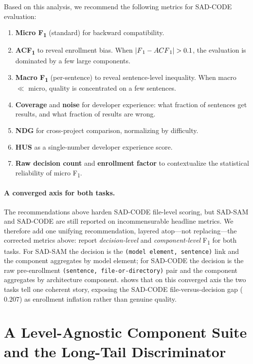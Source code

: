 \documentclass[11pt,a4paper]{report}
\newcommand{\sadcode}{SAD-CODE\xspace}
\newcommand{\sadsam}{SAD-SAM\xspace}
\newcommand{\fone}{F\textsubscript{1}\xspace}
\newcommand{\acfone}{ACF\textsubscript{1}\xspace}
\begin{document}
Based on this analysis, we recommend the following metrics for \sadcode
evaluation:

\begin{enumerate}
\item \textbf{Micro \fone} (standard) for backward compatibility.
\item \textbf{\acfone} to reveal enrollment bias. When $|\fone - \acfone| >
  0.1$, the evaluation is dominated by a few large components.
\item \textbf{Macro \fone} (per-sentence) to reveal sentence-level inequality.
  When macro $\ll$ micro, quality is concentrated on a few sentences.
\item \textbf{Coverage} and \textbf{noise} for developer experience:
  what fraction of sentences get results, and what fraction of results are wrong.
\item \textbf{NDG} for cross-project comparison, normalizing by difficulty.
\item \textbf{HUS} as a single-number developer experience score.
\item \textbf{Raw decision count} and \textbf{enrollment factor} to
  contextualize the statistical reliability of micro \fone.
\end{enumerate}

\paragraph{A converged axis for both tasks.}
The recommendations above harden \sadcode file-level scoring, but \sadsam
and \sadcode are still reported on incommensurable headline metrics. We
therefore add one unifying recommendation, layered atop---not replacing---the
corrected metrics above: report \emph{decision-level} and
\emph{component-level} \fone for both tasks. For \sadsam the decision is the
\texttt{(model element, sentence)} link and the component aggregates by model
element; for \sadcode the decision is the raw pre-enrollment
\texttt{(sentence, file-or-directory)} pair and the component aggregates by
architecture component.  shows that on this
converged axis the two tasks tell one coherent story, exposing the \sadcode
file-versus-decision gap ($0.207$) as enrollment inflation rather than
genuine quality.




\section{A Level-Agnostic Component Suite and the Long-Tail Discriminator}
\label{sec:eval:component-suite}
\end{document}
